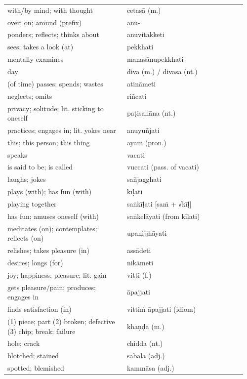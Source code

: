 \documentclass[11pt,oneside]{memoir}
\begin{document}
\bigskip

\begin{longtable}{L{0.48\linewidth} L{0.48\linewidth}}
with/by mind; with thought & cetasā (m.)\\[0pt]
over; on; around (prefix) & anu-\\[0pt]
ponders; reflects; thinks about & anuvitakketi\\[0pt]
sees; takes a look (at) & pekkhati\\[0pt]
mentally examines & manasānupekkhati\\[0pt]
day & diva (m.) / divasa (nt.)\\[0pt]
(of time) passes; spends; wastes & atināmeti\\[0pt]
neglects; omits & riñcati\\[0pt]
privacy; solitude; lit. sticking to oneself & paṭisallāna (nt.)\\[0pt]
practices; engages in; lit. yokes near & anuyuñjati\\[0pt]
this; this person; this thing & ayaṁ (pron.)\\[0pt]
speaks & vacati\\[0pt]
is said to be; is called & vuccati (pass. of vacati)\\[0pt]
laughs; jokes & sañjagghati\\[0pt]
plays (with); has fun (with) & kīḷati\\[0pt]
playing together & saṅkīḷati [saṁ + √kīḷ]\\[0pt]
has fun; amuses oneself (with) & saṅkelāyati (from kīḷati)\\[0pt]
meditates (on); contemplates; reflects (on) & upanijjhāyati\\[0pt]
relishes; takes pleasure (in) & assādeti\\[0pt]
desires; longs (for) & nikāmeti\\[0pt]
joy; happiness; pleasure; lit. gain & vitti (f.)\\[0pt]
gets pleasure/pain; produces; engages in & āpajjati\\[0pt]
finds satisfaction (in) & vittiṁ āpajjati (idiom)\\[0pt]
(1) piece; part (2) broken; defective (3) chip; break; failure & khaṇḍa (m.)\\[0pt]
hole; crack & chidda (nt.)\\[0pt]
blotched; stained & sabala (adj.)\\[0pt]
spotted; blemished & kammāsa (adj.)\\[0pt]
\end{longtable}
\end{document}
